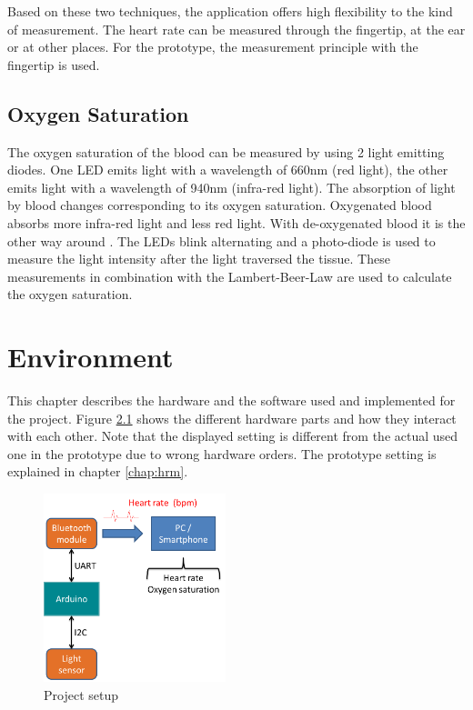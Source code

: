 \documentclass[notitlepage]{scrreprt}
\begin{document}
Based on these two techniques, the application offers high flexibility to the kind of measurement. The heart rate can be measured through the fingertip, at the ear or at other places. For the prototype, the measurement principle with the fingertip is used. 

\section{Oxygen Saturation}
The oxygen saturation of the blood can be measured by using 2 light emitting diodes. One LED emits light with a wavelength of 660nm (red light), the other emits light with a wavelength of 940nm (infra-red light). The absorption of light by blood changes corresponding to its oxygen saturation. Oxygenated blood absorbs more infra-red light and less red light. With de-oxygenated blood it is the other way around \cite{bib:pulse-oximetry}. The LEDs blink alternating and a photo-diode is used to measure the light intensity after the light traversed the tissue. These measurements in combination with the Lambert-Beer-Law are used to calculate the oxygen saturation.

\chapter{Environment}
\label{chap:environment}
This chapter describes the hardware and the software used and implemented for the project. Figure \ref{fig:data-flow} shows the different hardware parts and how they interact with each other. Note that the displayed setting is different from the actual used one in the prototype due to wrong hardware orders. The prototype setting is explained in chapter \ref{chap:hrm}.

\begin{figure}[H]
	\centering
	\includegraphics[width=200px]{images/general_dataFlow.png}
	\caption{Project setup}
	\label{fig:data-flow}
\end{figure}
\end{document}
